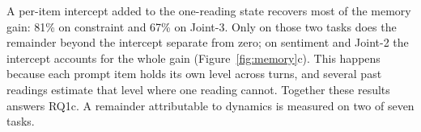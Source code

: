A per-item intercept added to the one-reading state recovers most of the memory gain: 81\% on constraint and 67\% on Joint-3.  %
Only on those two tasks does the remainder beyond the intercept separate from zero; on sentiment and Joint-2 the intercept accounts for the whole gain (Figure~\ref{fig:memory}c).  %
This happens because each prompt item holds its own level across turns, and several past readings estimate that level where one reading cannot.  %
Together these results answers RQ1c. A remainder attributable to dynamics is measured on two of seven tasks.
